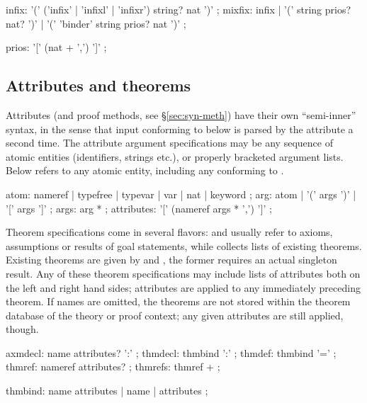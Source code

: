 \begin{rail}
  infix: '(' ('infix' | 'infixl' | 'infixr') string? nat ')'
  ;
  mixfix: infix | '(' string prios? nat? ')' | '(' 'binder' string prios? nat ')'
  ;

  prios: '[' (nat + ',') ']'
  ;
\end{rail}


\subsection{Attributes and theorems}\label{sec:syn-att}

Attributes (and proof methods, see \S\ref{sec:syn-meth}) have their own
``semi-inner'' syntax, in the sense that input conforming to
 below is parsed by the attribute a second time.  The
attribute argument specifications may be any sequence of atomic entities
(identifiers, strings etc.), or properly bracketed argument lists.  Below
 refers to any atomic entity, including any
 conforming to .

\begin{rail}
  atom: nameref | typefree | typevar | var | nat | keyword
  ;
  arg: atom | '(' args ')' | '[' args ']'
  ;
  args: arg *
  ;
  attributes: '[' (nameref args * ',') ']'
  ;
\end{rail}

Theorem specifications come in several flavors:  and
 usually refer to axioms, assumptions or results of goal
statements, while  collects lists of existing theorems.
Existing theorems are given by  and ,
the former requires an actual singleton result.  Any of these theorem
specifications may include lists of attributes both on the left and right hand
sides; attributes are applied to any immediately preceding theorem.  If names
are omitted, the theorems are not stored within the theorem database of the
theory or proof context; any given attributes are still applied, though.

\begin{rail}
  axmdecl: name attributes? ':'
  ;
  thmdecl: thmbind ':'
  ;
  thmdef: thmbind '='
  ;
  thmref: nameref attributes?
  ;
  thmrefs: thmref +
  ;

  thmbind: name attributes | name | attributes
  ;
\end{rail}


